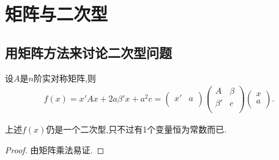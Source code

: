 \documentclass[../../main.tex]{subfiles}%
\begin{document}
\section{矩阵与二次型}

\subsection{用矩阵方法来讨论二次型问题}

\begin{lemma}\label{lemma:一般二次型的矩阵形式}
设$A$是$n$阶实对称矩阵,则
\begin{align*}
f\left( x \right) =x' Ax+2a\beta ' x+a^2c=\left( \begin{matrix}
x'&		a\\
\end{matrix} \right) \left( \begin{matrix}
A&		\beta\\
\beta '&		c\\
\end{matrix} \right) \left( \begin{array}{c}
x\\
a\\
\end{array} \right) .
\end{align*}
\end{lemma}
\begin{remark}
上述$f(x)$仍是一个二次型,只不过有1个变量恒为常数而已.
\end{remark}
\begin{proof}
由矩阵乘法易证.
\end{proof}
\end{document}
